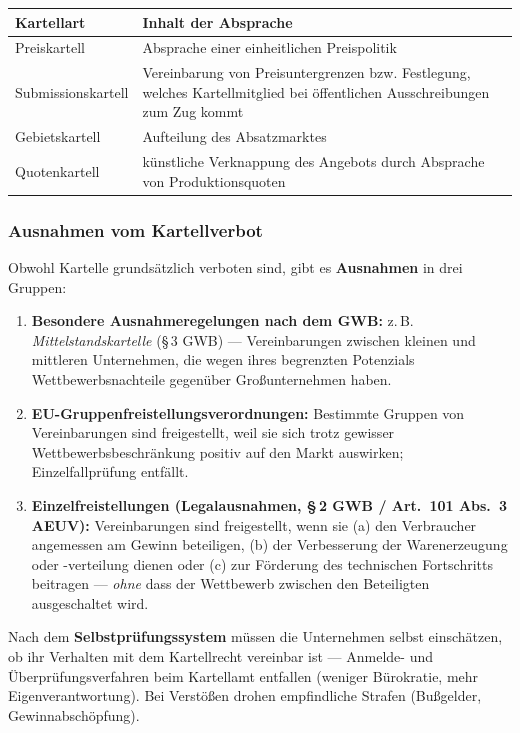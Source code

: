 \documentclass[11pt, a4paper]{article}
\begin{document}
\begin{center}
\begin{tabular}{p{4.2cm} p{9.8cm}}
\toprule
\textbf{Kartellart} & \textbf{Inhalt der Absprache}\\
\midrule
Preiskartell & Absprache einer einheitlichen Preispolitik\\
Submissionskartell & Vereinbarung von Preisuntergrenzen bzw. Festlegung, welches Kartellmitglied bei öffentlichen Ausschreibungen zum Zug kommt\\
Gebietskartell & Aufteilung des Absatzmarktes\\
Quotenkartell & künstliche Verknappung des Angebots durch Absprache von Produktionsquoten\\
\bottomrule
\end{tabular}
\end{center}

\subsubsection{Ausnahmen vom Kartellverbot}

Obwohl Kartelle grundsätzlich verboten sind, gibt es \textbf{Ausnahmen} in drei Gruppen:

\begin{enumerate}
  \item \textbf{Besondere Ausnahmeregelungen nach dem GWB:} z.\,B.
    \emph{Mittelstandskartelle} (\S\,3 GWB) --- Vereinbarungen zwischen kleinen und
    mittleren Unternehmen, die wegen ihres begrenzten Potenzials Wettbewerbsnachteile
    gegenüber Großunternehmen haben.
  \item \textbf{EU-Gruppenfreistellungsverordnungen:} Bestimmte Gruppen von Vereinbarungen
    sind freigestellt, weil sie sich trotz gewisser Wettbewerbsbeschränkung positiv auf
    den Markt auswirken; Einzelfallprüfung entfällt.
  \item \textbf{Einzelfreistellungen (Legalausnahmen, \S\,2 GWB / Art.~101 Abs.~3 AEUV):}
    Vereinbarungen sind freigestellt, wenn sie (a) den Verbraucher angemessen am Gewinn
    beteiligen, (b) der Verbesserung der Warenerzeugung oder -verteilung dienen oder
    (c) zur Förderung des technischen Fortschritts beitragen --- \emph{ohne} dass der
    Wettbewerb zwischen den Beteiligten ausgeschaltet wird.
\end{enumerate}

Nach dem \textbf{Selbstprüfungssystem} müssen die Unternehmen selbst einschätzen, ob ihr
Verhalten mit dem Kartellrecht vereinbar ist --- Anmelde- und Überprüfungsverfahren beim
Kartellamt entfallen (weniger Bürokratie, mehr Eigenverantwortung). Bei Verstößen drohen
empfindliche Strafen (Bußgelder, Gewinnabschöpfung).
\end{document}
